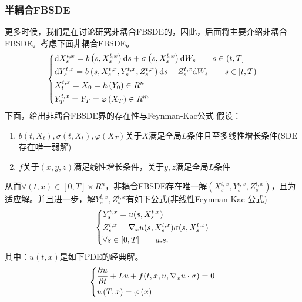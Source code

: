 		\subsubsection{半耦合FBSDE}
			\par
			更多时候，我们是在讨论研究非耦合FBSDE的，因此，后面将主要介绍非耦合FBSDE。考虑下面非耦合FBSDE。
					\begin{equation*}
						\centering
					\left\{\begin{lgathered}
					{\mathrm{d}X_s^{t,x} = b\left( {s,X_s^{t,x}} \right)\mathrm{d}s + \sigma \left( {s,X_s^{t,x}} \right)\mathrm{d}{W_s} \qquad s \in \left( {t,T} \right]}\\
					{\mathrm{d}Y_s^{t,x} = b\left( {s,X_s^{t,x},Y_s^{t,x},Z_s^{t,x}} \right)\mathrm{d}s - Z_s^{t,x}\mathrm{d}{W_s} \qquad s \in \left[ {t,T} \right)}\\
					{X_t^{t,x} = {X_0} = h\left( {{Y_0}} \right) \in {R^n}}\\
					{Y_T^{t,x} = {Y_T} = \varphi \left( {{X_T}} \right) \in {R^m}}
					\end{lgathered} \right.
					\end{equation*}
			下面，给出非耦合FBSDE界的存在性与Feynman-Kac公式
			假设：
			\begin{enumerate}
			  \item $b(t,X_t),\sigma(t,X_t),\varphi(X_T)$关于$X$满足全局$L$条件且至多线性增长条件(SDE存在唯一弱解)
			  \item $f$关于$(x,y,z)$满足线性增长条件，关于$y,z$满足全局$L$条件
			\end{enumerate}
			从而$\forall (t,x) \in [0,T] \times R^n$，非耦合FBSDE存在唯一解$(X_s^{t,x},Y_s^{t,x},Z_s^{t,x})$，且为适应解。并且进一步，解$Y_s^{t,x},Z_s^{t,x}$有如下公式(非线性Feynman-Kac 公式)
						\begin{equation*}
					\centering
					\left\{\begin{lgathered}
					Y_s^{t,x} = u( {s,X_s^{t,x}} )\\
					Z_s^{t,x}= {\nabla _x} u({s,X_s^{t,x}})\sigma ({s,X_s^{t,x}})\\
					\forall s \in [ 0,T] \qquad a.s.
					\end{lgathered} \right.
						\end{equation*}
			其中：$u(t,x)$是如下PDE的经典解。
					\begin{equation*}
				\centering
					\left\{\begin{lgathered}
					{\frac{{\partial u}}{{\partial t}} + {Lu} + f({t,x,u,{\nabla _x}u\cdot\sigma})= 0}\\
					{u\left( {T,x} \right) = \varphi \left(x \right)}
					\end{lgathered} \right.
					\end{equation*}
